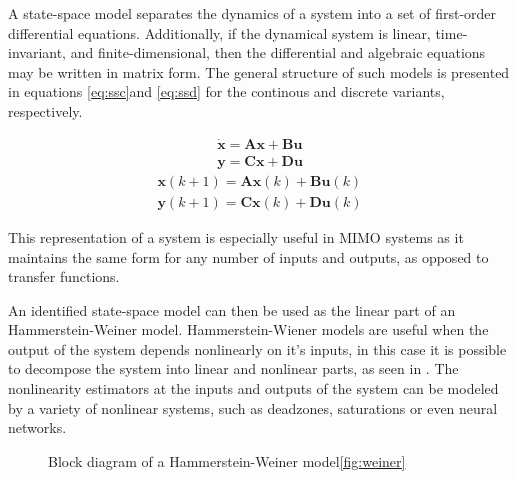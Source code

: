 A state-space model separates the dynamics of a system into a set of first-order differential equations.
Additionally, if the dynamical system is linear, time-invariant, and finite-dimensional, then the differential and algebraic equations may be written in matrix form. The general structure of such models is presented in equations \ref{eq:ssc}and \ref{eq:ssd} for the continous and discrete variants, respectively.

\begin{align}\label{eq:ssc}
\dot{\mathbf{x}} = \mathbf{A}\mathbf{x} + \mathbf{B}\mathbf{u} \\
\mathbf{y} = \mathbf{C}\mathbf{x} + \mathbf{D}\mathbf{u}
\end{align}
\vspace{-0.5cm}
\begin{align}\label{eq:ssd}
\mathbf{x}(k+1) = \mathbf{A}\mathbf{x}(k) + \mathbf{B}\mathbf{u}(k)\\
\mathbf{y}(k+1) = \mathbf{C}\mathbf{x}(k) + \mathbf{D}\mathbf{u}(k)
\end{align}

This representation of a system is especially useful in MIMO systems as it maintains the same form for any number of inputs and outputs, as opposed to transfer functions.

An identified state-space model can then be used as the linear part of an Hammerstein-Weiner model.
Hammerstein-Wiener models are useful when the output of the system depends nonlinearly on it's inputs, in this case it is possible to decompose the system into linear and nonlinear parts, as seen in . 
The nonlinearity estimators at the inputs and outputs of the system can be modeled by a variety of nonlinear systems, such as deadzones, saturations or even neural networks.

\begin{figure} 
\caption{Block diagram of a Hammerstein-Weiner model\ref{fig:weiner}}
\label{weiner}
\end{figure}


